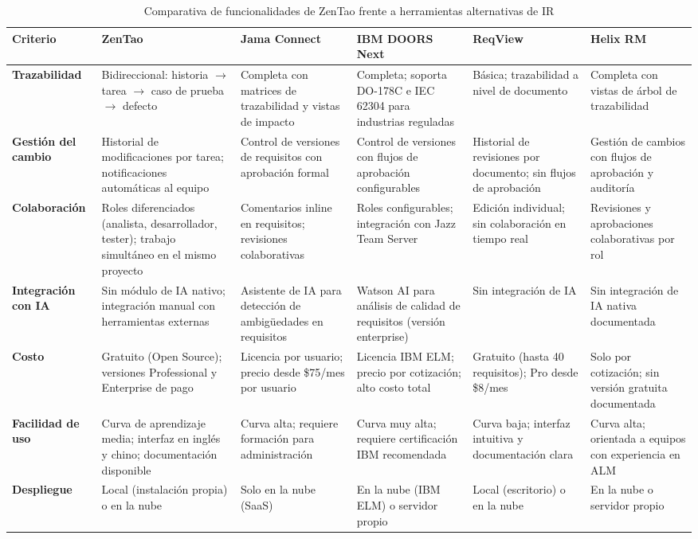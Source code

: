 \documentclass[journal,onecolumn]{IEEEtran}
\begin{document}
\begin{table}[H]
	\caption{Comparativa de funcionalidades de ZenTao frente a herramientas alternativas de IR}
	\label{tab:comparativa}
	\renewcommand{\arraystretch}{1.3}
	\begin{tabularx}{\textwidth}{|l|X|X|X|X|X|}
		\hline
		\textbf{Criterio} & \textbf{ZenTao} & \textbf{Jama Connect} & \textbf{IBM DOORS Next} & \textbf{ReqView} & \textbf{Helix RM} \\
		\hline
		\textbf{Trazabilidad} \cite{hussain2022}
		& Bidireccional: historia $\rightarrow$ tarea $\rightarrow$ caso de prueba $\rightarrow$ defecto
		& Completa con matrices de trazabilidad y vistas de impacto
		& Completa; soporta DO-178C e IEC 62304 para industrias reguladas
		& Básica; trazabilidad a nivel de documento
		& Completa con vistas de árbol de trazabilidad \\
		\hline
		\textbf{Gestión del cambio} \cite{wiegers2013}
		& Historial de modificaciones por tarea; notificaciones automáticas al equipo
		& Control de versiones de requisitos con aprobación formal
		& Control de versiones con flujos de aprobación configurables
		& Historial de revisiones por documento; sin flujos de aprobación
		& Gestión de cambios con flujos de aprobación y auditoría \\
		\hline
		\textbf{Colaboración} \cite{zentao2025}
		& Roles diferenciados (analista, desarrollador, tester); trabajo simultáneo en el mismo proyecto
		& Comentarios inline en requisitos; revisiones colaborativas
		& Roles configurables; integración con Jazz Team Server
		& Edición individual; sin colaboración en tiempo real
		& Revisiones y aprobaciones colaborativas por rol \\
		\hline
		\textbf{Integración con IA} \cite{siddique2023}
		& Sin módulo de IA nativo; integración manual con herramientas externas
		& Asistente de IA para detección de ambigüedades en requisitos
		& Watson AI para análisis de calidad de requisitos (versión enterprise)
		& Sin integración de IA
		& Sin integración de IA nativa documentada \\
		\hline
		\textbf{Costo} \cite{wiegers2013}
		& Gratuito (Open Source); versiones Professional y Enterprise de pago
		& Licencia por usuario; precio desde \$75/mes por usuario
		& Licencia IBM ELM; precio por cotización; alto costo total
		& Gratuito (hasta 40 requisitos); Pro desde \$8/mes
		& Solo por cotización; sin versión gratuita documentada \\
		\hline
		\textbf{Facilidad de uso} \cite{hussain2022}
		& Curva de aprendizaje media; interfaz en inglés y chino; documentación disponible
		& Curva alta; requiere formación para administración
		& Curva muy alta; requiere certificación IBM recomendada
		& Curva baja; interfaz intuitiva y documentación clara
		& Curva alta; orientada a equipos con experiencia en ALM \\
		\hline
		\textbf{Despliegue} \cite{zentao2025}
		& Local (instalación propia) o en la nube
		& Solo en la nube (SaaS)
		& En la nube (IBM ELM) o servidor propio
		& Local (escritorio) o en la nube
		& En la nube o servidor propio \\
		\hline
	\end{tabularx}
\end{table}
\end{document}
